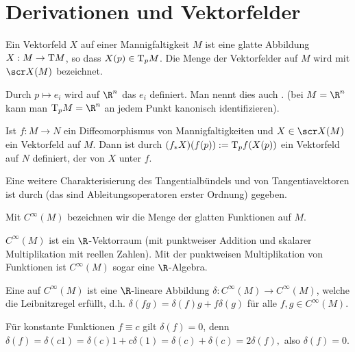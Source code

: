 

\section{Derivationen und Vektorfelder}


\begin{df} \label{3.7}
    Ein Vektorfeld $X$ auf einer Mannigfaltigkeit $M$ ist eine glatte Abbildung $X: M \to \mathrm{T} M$, so dass $X(p) \in \mathrm{T}_p M$.
    Die Menge der Vektorfelder auf $M$ wird mit $\scr X(M)$ bezeichnet.
\end{df}

\begin{ex*}
    Durch $p \mapsto e_i$ wird auf $\R^n$ das  $e_i$ definiert.
    Man nennt dies auch .
    (bei $M = \R^n$ kann man $\T_p M = \R^n$ an jedem Punkt kanonisch identifizieren).
\end{ex*}

\begin{df} \label{3.8}
    Ist $f: M \to N$ ein Diffeomorphismus von Mannigfaltigkeiten und $X \in \scr X(M)$ ein Vektorfeld auf $M$.
    Dann ist durch
    \begin{math}
        (f_* X)(f(p)) := \mathrm{T}_p f(X(p))
    \end{math}
    ein Vektorfeld auf $N$ definiert, der  von $X$ unter $f$.
\end{df}

Eine weitere Charakterisierung des Tangentialbündels und von Tangentiavektoren ist durch  (das sind Ableitungsoperatoren erster Ordnung) gegeben.

\begin{df} \label{3.9}
    Mit $C^\infty(M)$ bezeichnen wir die Menge der glatten Funktionen auf $M$.
    \begin{note}
        $C^\infty(M)$ ist ein $\R$-Vektorraum (mit punktweiser Addition und skalarer Multiplikation mit reellen Zahlen).
        Mit der punktweisen Multiplikation von Funktionen ist $C^\infty(M)$ sogar eine $\R$-Algebra.
    \end{note}
\end{df}

\begin{df} \label{3.10}
    Eine  auf $C^\infty(M)$ ist eine $\R$-lineare Abbildung $\delta: C^\infty(M) \to C^\infty(M)$, welche die Leibnitzregel erfüllt, d.h.
    \begin{math}
        \delta(fg) = \delta(f) g + f \delta(g)
    \end{math}
    für alle $f, g \in C^\infty(M)$.
    \begin{note}
        Für konstante Funktionen $f \equiv c$ gilt $\delta(f) = 0$, denn
        \begin{math}
            \delta(f) = \delta(c 1)
            = \delta(c)1 + c \delta(1)
            = \delta(c) + \delta(c)
            = 2 \delta(f),
        \end{math}
        also $\delta(f) = 0$.
    \end{note}
\end{df}

